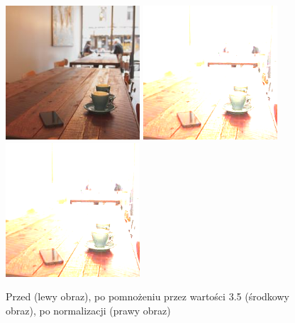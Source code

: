 \documentclass[a4paper,12pt]{book}
\begin{document}
\begin{figure}[H]
	\caption{Przed (lewy obraz), po pomnożeniu przez wartości 3.5 (środkowy obraz), po normalizacji (prawy obraz)}
	\includegraphics[width=5cm, height=5cm]{coffee-unmodified.jpg}
	\includegraphics[width=5cm, height=5cm]{3-2/multiply-color-const-coffee-35.png}
	\includegraphics[width=5cm, height=5cm]{3-2/multiply-color-const-coffee-35-norm.png}
\end{figure}
\end{document}
